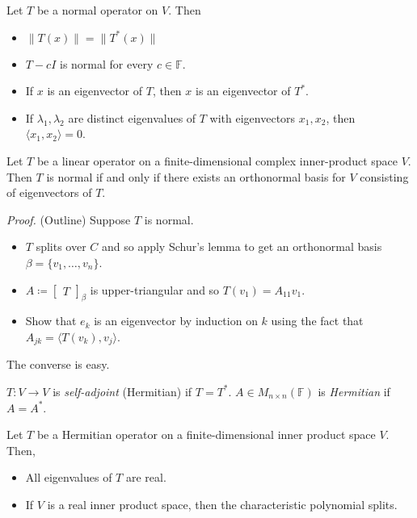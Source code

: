 \documentclass[12pt]{article}
\newenvironment{lemma}[2][Lemma]{\begin{trivlist}
\item[\hskip \labelsep {\bfseries #1}\hskip \labelsep {\bfseries #2.}]}{\end{trivlist}}
\newenvironment{theorem}[2][Theorem]{\begin{trivlist}
\item[\hskip \labelsep {\bfseries #1}\hskip \labelsep {\bfseries #2.}]}{\end{trivlist}}
\newenvironment{definition}[2][Definition]{\begin{trivlist}
\item[\hskip \labelsep {\bfseries #1}\hskip \labelsep {\bfseries #2}]}{\end{trivlist}}
\begin{document}
\begin{theorem}{6.15}
Let $T$ be a normal operator on $V$. Then 

\begin{itemize}
    \item[(a)] $\lVert T(x) \rVert = \lVert T^*(x) \rVert$
    
    \item[(b)] $T - cI$ is normal for every $c \in \mathbb{F}$.
    
    \item[(c)] If $x$ is an eigenvector of $T$, then $x$ is an eigenvector of $T^*$.
    
    \item[(d)] If $\lambda_1, \lambda_2$ are distinct eigenvalues of $T$ with eigenvectors $x_1, x_2$, then $\langle x_1, x_2 \rangle = 0$.
\end{itemize}
\end{theorem}

\begin{theorem}{6.16}
Let $T$ be a linear operator on a finite-dimensional complex inner-product space $V$. Then $T$ is normal if and only if there exists an orthonormal basis for $V$ consisting of eigenvectors of $T$.
\end{theorem}

\textit{Proof.} (Outline) Suppose $T$ is normal.

\begin{itemize}
    \item $T$ splits over $C$ and so apply Schur's lemma to get an orthonormal basis $\beta = \{v_1, \dots, v_n\}$.
    
    \item $A \coloneqq \begin{bmatrix} T \end{bmatrix}_\beta$ is upper-triangular and so $T(v_1) = A_{11}v_1$.
    
    \item Show that $e_k$ is an eigenvector by induction on $k$ using the fact that $A_{jk} = \langle T(v_k), v_j \rangle$.
\end{itemize}

The converse is easy.

\begin{definition}{8}
$T : V \to V$ is \textit{self-adjoint} (Hermitian) if $T = T^*$. $A \in M_{n \times n}(\mathbb{F})$ is \textit{Hermitian} if $A = A^*$. 
\end{definition}

\begin{lemma}{19}
Let $T$ be a Hermitian operator on a finite-dimensional inner product space $V$. Then,

\begin{itemize}
    \item[(a)] All eigenvalues of $T$ are real.
    
    \item[(b)] If $V$ is a real inner product space, then the characteristic polynomial splits.
\end{itemize}
\end{lemma}
\end{document}
